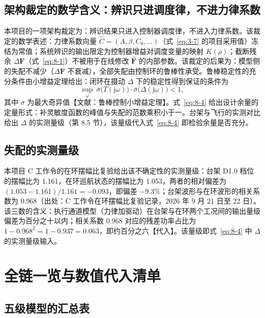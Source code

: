 \documentclass[11pt,a4paper]{ctexart}
\numberwithin{equation}{section}
\begin{document}
\subsection{架构裁定的数学含义：辨识只进调度律，不进力律系数}

本项目的一项架构裁定为：辨识结果只进入控制器调度律，不进入力律系数。该裁定的数学表述：力律系数向量 $\hat{C} = (A, \beta, C_0, \ldots)$（式~\eqref{eq:3-7} 的项目采用值）冻结为常值；系统辨识的输出限定为控制器增益对调度变量的映射 $K(\rho)$；截断残余 $\Delta\bm{F}$（式~\eqref{eq:8-1}）不被用于在线修改 $\hat{\bm{F}}$ 的内部参数。该裁定的后果为：模型侧的失配不减少（$\Delta\bm{F}$ 不衰减），全部失配由控制环的鲁棒性承受。鲁棒稳定性的充分条件由小增益定理给出：闭环在摄动 $\Delta$ 下的稳定性得到保证的条件为
\begin{equation}
  \sup_{\omega}\ \bar{\sigma}\bigl(T(\mathrm{j}\omega)\bigr)\cdot\bar{\sigma}\bigl(\Delta(\mathrm{j}\omega)\bigr) < 1, \label{eq:8-4}
\end{equation}
其中 $\bar{\sigma}$ 为最大奇异值【文献：鲁棒控制小增益定理】。式~\eqref{eq:8-4} 给出设计余量的定量形式：补灵敏度函数的峰值与失配的范数乘积小于一。台架与飞行的实测对比给出 $\Delta$ 的实测量级（第 8.5 节），该量级代入式~\eqref{eq:8-4} 即检验余量是否充分。

\subsection{失配的实测量级}

本项目 C 工作令的在环摆幅比复验给出该不确定性的实测量级：台架 D1.0 档位的摆幅比为 1.161，在环巡航状态的摆幅比为 1.053，两者的相对偏差为 $(1.053 - 1.161)/1.161 = -0.093$，即偏差 $-9.3\%$；台架波形与在环波形的相关系数为 0.968（出处：C 工作令在环摆幅比复验记录，2026 年 9 月 21 日至 22 日）。该三数的含义：执行通道模型（力律加驱动）在台架与在环两个工况间的输出量级偏差为百分之十以内；相关系数 0.968 对应的残差功率占比为 $1 - 0.968^2 = 1 - 0.937 = 0.063$，即约百分之六【代入】。该量级即式~\eqref{eq:8-4} 中 $\Delta$ 的实测量级输入。

\section{全链一览与数值代入清单}\label{sec:summary}

\subsection{五级模型的汇总表}
\end{document}
